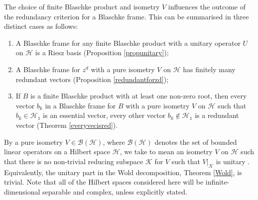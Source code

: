 \documentclass[10pt, reqno]{amsart}
\theoremstyle{definition}
\numberwithin{equation}{section}
\begin{document}
The choice of finite Blaschke product and isometry $V$ influences the outcome of the redundancy criterion for a Blaschke frame. This can be summarised in three distinct cases as follows:

\begin{enumerate}
    \item A Blaschke frame for any finite Blaschke product with a unitary operator $U$ on $\mathcal{H}$ is a Riesz basis (Proposition \ref{propunitary});
    \item A Blaschke frame for $z^{d}$ with a pure isometry $V$ on $\mathcal{H}$ has finitely many redundant vectors (Proposition \ref{redundantforzd});
    \item If $B$ is a finite Blaschke product with at least one non-zero root, then every vector $b_{k}$ in a Blaschke frame for $B$ with a pure isometry $V$ on $\mathcal{H}$ such that $b_{k}\in\mathcal{H}_{1}$ is an essential vector, every other vector $b_{k}\not\in\mathcal{H}_{1}$ is a redundant vector (Theorem \ref{everyvecisred}).
\end{enumerate}

\noindent By a pure isometry $V\in\mathcal{B}(\mathcal{H})$, where $\mathcal{B}(\mathcal{H})$ denotes the set of bounded linear operators on a Hilbert space $\mathcal{H}$, we take to mean an isometry $V$ on $\mathcal{H}$ such that there is no non-trivial reducing subspace $\mathcal{K}$ for $V$ such that $V|_{\mathcal{K}}$ is unitary \cite[Section 3]{NagyFoais}. Equivalently, the unitary part in the Wold decomposition, Theorem \ref{Wold}, is trivial. Note that all of the Hilbert spaces considered here will be infinite-dimensional separable and complex, unless explicitly stated.
\end{document}
